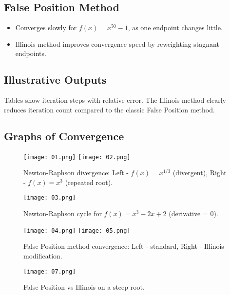 \documentclass[12pt,a4paper]{article}
\begin{document}
\subsection{False Position Method}
\begin{itemize}
    \item Converges slowly for $f(x) = x^{50} - 1$, as one endpoint changes little.
    \item Illinois method improves convergence speed by reweighting stagnant endpoints.
\end{itemize}

\subsection{Illustrative Outputs}
Tables show iteration steps with relative error. The Illinois method clearly reduces iteration count compared to the classic False Position method.

\subsection{Graphs of Convergence}

\begin{figure}[H]
    \centering
    \texttt{[image: 01.png]}
    \texttt{[image: 02.png]}
    \caption{Newton-Raphson divergence: Left - $f(x) = x^{1/3}$ (divergent), Right - $f(x) = x^3$ (repeated root).}
    \label{fig:newton-divergence}
\end{figure}

\clearpage

\begin{figure}[H]
    \centering
    \texttt{[image: 03.png]}
    \caption{Newton-Raphson cycle for $f(x) = x^3-2x+2$ (derivative = 0).}
    \label{fig:newton-cycle}
\end{figure}

\clearpage

\begin{figure}[H]
    \centering
    \texttt{[image: 04.png]}
    \texttt{[image: 05.png]}
    \caption{False Position method convergence: Left - standard, Right - Illinois modification.}
    \label{fig:falseposition-convergence}
\end{figure}

\clearpage

\begin{figure}[H]
    \centering
    \texttt{[image: 07.png]}
    \caption{False Position vs Illinois on a steep root.} 
    \label{fig:falseposition-steep}
\end{figure}
\end{document}
